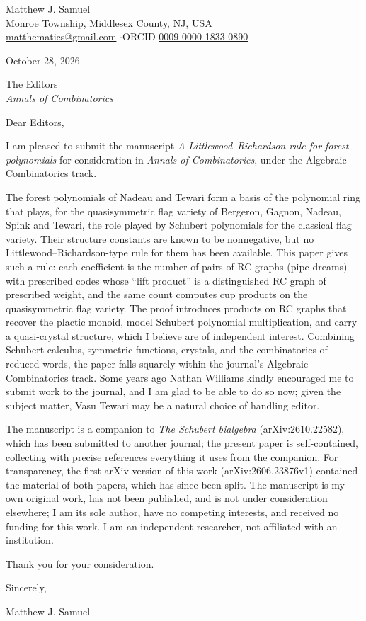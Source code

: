 \documentclass[11pt]{article}
\begin{document}
Matthew J. Samuel\\
Monroe Township, Middlesex County, NJ, USA\\
\href{mailto:matthematics@gmail.com}{matthematics@gmail.com} \quad$\cdot$\quad ORCID \href{https://orcid.org/0009-0000-1833-0890}{0009-0000-1833-0890}

October 28, 2026

The Editors\\
\emph{Annals of Combinatorics}

Dear Editors,

I am pleased to submit the manuscript \emph{A Littlewood--Richardson rule for forest polynomials} for consideration in \emph{Annals of Combinatorics}, under the Algebraic Combinatorics track.

The forest polynomials of Nadeau and Tewari form a basis of the polynomial ring that plays, for the quasisymmetric flag variety of Bergeron, Gagnon, Nadeau, Spink and Tewari, the role played by Schubert polynomials for the classical flag variety. Their structure constants are known to be nonnegative, but no Littlewood--Richardson-type rule for them has been available. This paper gives such a rule: each coefficient is the number of pairs of RC graphs (pipe dreams) with prescribed codes whose ``lift product'' is a distinguished RC graph of prescribed weight, and the same count computes cup products on the quasisymmetric flag variety. The proof introduces products on RC graphs that recover the plactic monoid, model Schubert polynomial multiplication, and carry a quasi-crystal structure, which I believe are of independent interest. Combining Schubert calculus, symmetric functions, crystals, and the combinatorics of reduced words, the paper falls squarely within the journal's Algebraic Combinatorics track. Some years ago Nathan Williams kindly encouraged me to submit work to the journal, and I am glad to be able to do so now; given the subject matter, Vasu Tewari may be a natural choice of handling editor.

The manuscript is a companion to \emph{The Schubert bialgebra} (arXiv:2610.22582), which has been submitted to another journal; the present paper is self-contained, collecting with precise references everything it uses from the companion. For transparency, the first arXiv version of this work (arXiv:2606.23876v1) contained the material of both papers, which has since been split. The manuscript is my own original work, has not been published, and is not under consideration elsewhere; I am its sole author, have no competing interests, and received no funding for this work. I am an independent researcher, not affiliated with an institution.

Thank you for your consideration.

Sincerely,

\vspace{1.2\baselineskip}
Matthew J. Samuel
\end{document}
